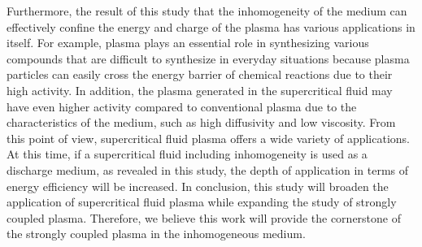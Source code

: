 Furthermore, the result of this study that the inhomogeneity of the medium can effectively confine the energy and charge of the plasma has various applications in itself. For example, plasma plays an essential role in synthesizing various compounds that are difficult to synthesize in everyday situations because plasma particles can easily cross the energy barrier of chemical reactions due to their high activity. In addition, the plasma generated in the supercritical fluid may have even higher activity compared to conventional plasma due to the characteristics of the medium, such as high diffusivity and low viscosity. From this point of view, supercritical fluid plasma offers a wide variety of applications. At this time, if a supercritical fluid including inhomogeneity is used as a discharge medium, as revealed in this study, the depth of application in terms of energy efficiency will be increased. In conclusion, this study will broaden the application of supercritical fluid plasma while expanding the study of strongly coupled plasma. Therefore, we believe this work will provide the cornerstone of the strongly coupled plasma in the inhomogeneous medium.
